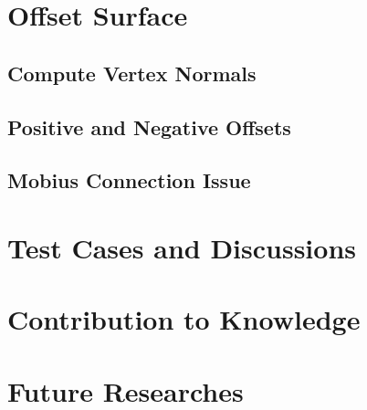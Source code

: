 \documentclass[12pt]{article}
\begin{document}
\section{Offset Surface} \label{sec:offset}

\subsection{Compute Vertex Normals}

\subsection{Positive and Negative Offsets}

\subsection{Mobius Connection Issue}


\section{Test Cases and Discussions}



\section{Contribution to Knowledge}





\section{Future Researches}
\end{document}
